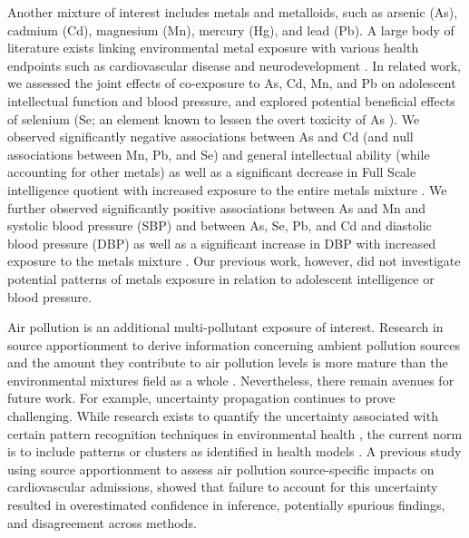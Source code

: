Another mixture of interest includes metals and metalloids, such as arsenic (As), cadmium (Cd), magnesium (Mn), mercury (Hg), and lead (Pb). A large body of literature exists linking environmental metal exposure with various health endpoints such as cardiovascular disease \citep{nigra2016environmental} and neurodevelopment \citep{henn2012associations}. In related work, we assessed the joint effects of co-exposure to As, Cd, Mn, and Pb on adolescent intellectual function and blood pressure, and explored potential beneficial effects of selenium (Se; an element known to lessen the overt toxicity of As \citep{levander1977metabolic}). We observed significantly negative associations between As and Cd (and null associations between Mn, Pb, and Se) and general intellectual ability (while accounting for other metals) as well as a significant decrease in Full Scale intelligence quotient with increased exposure to the entire metals mixture \citep{wasserman2018cross}. We further observed significantly positive associations between As and Mn and systolic blood pressure (SBP) and between As, Se, Pb, and Cd and diastolic blood pressure (DBP) as well as a significant increase in DBP with increased exposure to the metals mixture \citep{chen2019early}. Our previous work, however, did not investigate potential patterns of metals exposure in relation to adolescent intelligence or blood pressure.

Air pollution is an additional multi-pollutant exposure of interest. Research in source apportionment to derive information concerning ambient pollution sources and the amount they contribute to air pollution levels is more mature than the environmental mixtures field as a whole \citep{paatero94, sun2020positive, krall2017associations}. Nevertheless, there remain avenues for future work. For example, uncertainty propagation continues to prove challenging. While research exists to quantify the uncertainty associated with certain pattern recognition techniques in environmental health \citep{park2015part, gass2015ensemble}, the current norm is to include patterns or clusters as identified in health models \citep{austin2012framework, zanobetti2014health, sarnat2008fine, krall2017associations, basagana2016neurodevelopmental, siponen2015source, dai2016fine}. A previous study using source apportionment to assess air pollution source-specific impacts on cardiovascular admissions, \citet{mak14_unc} showed that failure to account for this uncertainty resulted in overestimated confidence in inference, potentially spurious findings, and disagreement across methods.

